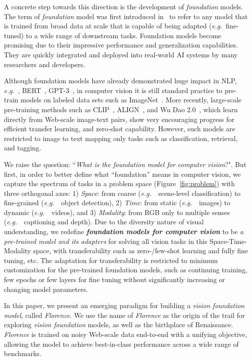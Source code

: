 \documentclass{article}
\newcommand{\eg}{{\it{e.g.}~}}
\begin{document}
A concrete step towards this direction is the development of \emph{foundation} models. The term of \emph{foundation} model was first introduced in~\cite{bommasani2021opportunities} to refer to any model that is trained from broad data at scale that is capable of being adapted (\eg fine-tuned) to a wide range of downstream tasks. Foundation models become promising due to their impressive performance and generalization capabilities. They are quickly integrated and deployed into real-world AI systems by many researchers and developers.

Although foundation models have already demonstrated huge impact in NLP, \eg, BERT~\cite{devlin2019bert}, GPT-3~\cite{brown2020language}, in computer vision it is still standard practice to pre-train models on labeled data sets such as ImageNet~\cite{deng2009imagenet}. More recently, large-scale pre-training methods such as CLIP~\cite{radford2021learning}, ALIGN~\cite{jia2021scaling}, and Wu Dao 2.0~\cite{Wudao2}, which learn directly from Web-scale image-text pairs, show very encouraging progress for efficient transfer learning, and zero-shot capability. However, such models are restricted to image to text mapping only tasks such as classification, retrieval, and tagging.

We raise the question: ``\emph{What is the foundation model for computer vision}?". But first, in order to better define what ``foundation'' means in computer vision, we capture the spectrum of tasks in a problem space  (Figure~\ref{fig:problem}) with three orthogonal axes: {1) \emph{Space}:} from coarse (\eg ~scene-level classification) to fine-grained (\eg ~object detection), {2) \emph{Time}:} from static (\eg ~images) to dynamic (\eg ~videos), and {3) \emph{Modality}:} from RGB only to multiple senses (\eg ~captioning and depth). Due to the diversity nature of visual understanding, we redefine {\bf{\emph{foundation models for computer vision}}} to be \emph{a pre-trained model and its adapters} for solving all vision tasks in this Space-Time-Modality space, with transferability such as zero-/few-shot learning and fully fine tuning, etc. The adaptation for transferability is restricted to minimum customization for the pre-trained foundation models, such as continuing training, few epochs or few layers for fine tuning without significantly increasing or changing model parameters.

In this paper, we present an emerging paradigm for building a \emph{vision foundation model}, called \emph{Florence}. We use the name of \emph{Florence} as the origin of the trail for exploring \emph{vision foundation} models, as well as the birthplace of Renaissance. \emph{Florence} is trained on noisy Web-scale data end-to-end with a unifying objective, allowing the model to achieve best-in-class performance across a wide range of benchmarks.
\end{document}
